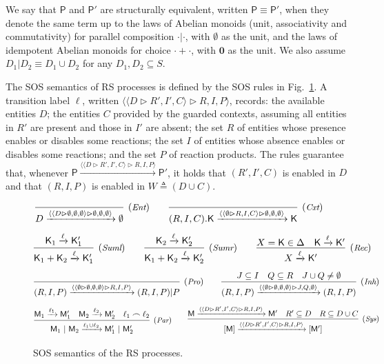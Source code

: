 \documentclass[sn-mathphys-num,a4paper,iicol,lineno,pdflatex]{sn-jnl-hacked}
\newcommand{\nil}{\mathbf{0}}
\newcommand{\obs}[2]{\langle #1\vartriangleright #2\rangle}
\theoremstyle{thmstyleone}%
\theoremstyle{thmstyletwo}%
\theoremstyle{thmstylethree}%
\begin{document}
We say that $\mathsf{P}$ and $\mathsf{P}'$ are structurally equivalent, written $\mathsf{P} \equiv \mathsf{P}'$, when they denote the same term up to the laws of Abelian monoids (unit, associativity and commutativity) for  parallel composition $\cdot | \cdot$, with $\emptyset$ as the unit, and the laws of idempotent Abelian monoids for choice $\cdot +\cdot$, with $\nil$ as the unit. We also assume $D_1 | D_2 \equiv D_1\cup D_2$ for any $D_1,D_2\subseteq S$.

The SOS semantics of  RS processes is defined by the SOS rules in Fig.~\ref{fig:guardforRS2nd}.
A transition label $\ell$, written $\obs{\obs{D}{R',I',C}}{R,I,P}$, records:
the available entities $D$; the entities $C$ provided by the guarded contexts, assuming all entities in $R'$ are present and those in $I'$ are absent;
the set $R$ of entities whose presence enables or disables some reactions;
the set $I$ of entities whose absence  enables or disables some reactions;
and the set $P$ of reaction products.
The  rules guarantee that, whenever $\mathsf{P}\xrightarrow{\obs{\obs{D}{R',I',C}}{R,I,P}} \mathsf{P}'$, it holds that $(R',I',C)$ is enabled in $D$ and that
$(R,I,P)$ is enabled in $W\triangleq (D\cup C)$.

\begin{figure}[t]
	{\footnotesize
		$$  
		\infer[(\textit{\scriptsize{Ent}})]
		{D \xrightarrow{\obs{\obs{D}{\emptyset,\emptyset,\emptyset}}{\emptyset,\emptyset,\emptyset}}\emptyset}
		{}
		\qquad
		\infer[(\textit{\scriptsize{Cxt}})]
		{(R,I,C).\mathsf{K} \xrightarrow{\obs{\obs{\emptyset}{R,I,C}}{\emptyset,\emptyset,\emptyset}}\mathsf{K}}{}
		$$
		$$
		\infer[(\textit{\scriptsize Suml})]
		{\mathsf{K}_1 + \mathsf{K}_2 \xrightarrow{\ell}\mathsf{K}'_1}
		{\mathsf{K}_1 \xrightarrow{\ell}\mathsf{K}'_1}
		\qquad
		\infer[(\textit{\scriptsize Sumr})]
		{\mathsf{K}_1 + \mathsf{K}_2 \xrightarrow{\ell}\mathsf{K}'_2}
		{\mathsf{K}_2 \xrightarrow{\ell}\mathsf{K}'_2}
		\qquad
		\infer[(\textit{\scriptsize Rec})]
		{X \xrightarrow{\ell}\mathsf{K}'}
		{X=\mathsf{K}\in\Delta & \mathsf{K} \xrightarrow{\ell}\mathsf{K}'}
		$$
		$$
		\infer[(\textit{\scriptsize Pro})]
		{(R,I,P)  \xrightarrow{\obs{\obs{\emptyset}{\emptyset,\emptyset,\emptyset}}{R,I,P}}(R,I,P)|P}
		{}
		\qquad
		\infer[(\textit{\scriptsize Inh})]
		{(R,I,P)  \xrightarrow{\obs{\obs{\emptyset}{\emptyset,\emptyset,\emptyset}}{J,Q,\emptyset}}(R,I,P)}
		{J \subseteq I & Q \subseteq R & J\cup Q\neq \emptyset}
		$$
		$$
		\infer[(\textit{\scriptsize Par})]
		{\mathsf{M}_1~|~\mathsf{M}_2\xrightarrow{\ell_1\cup\ell_2} \mathsf{M}'_1~|~\mathsf{M}'_2}
		{\mathsf{M}_1 \xrightarrow{\ell_1} \mathsf{M}'_1 &
		\mathsf{M}_2 \xrightarrow{\ell_2} \mathsf{M}'_2 &
			\ell_1\frown \ell_2 }
		\qquad
		\infer[(\textit{\scriptsize Sys})]
		{[\mathsf{M}]\xrightarrow{\obs{\obs{D}{R',I',C}}{R,I,P}} [\mathsf{M}']}
		{\mathsf{M}\xrightarrow{\obs{\obs{D}{R',I',C}}{R,I,P}} \mathsf{M}' &
		R'\subseteq D &
        R\subseteq D\cup C}
		$$
	}
		\caption{SOS semantics of the RS processes.}
		\label{fig:guardforRS2nd}
\end{figure}
\end{document}
